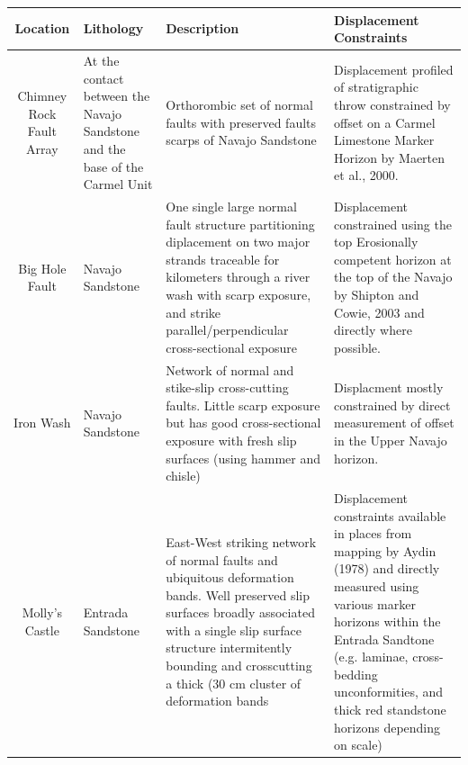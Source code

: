 \documentclass[12pt,a4paper]{article}
\begin{document}
	\afterpage %
    \clearpage%
    \thispagestyle{empty}%
    \begin{landscape}%
        \centering %
        	\begin{tabulary}{1.5\textwidth}{CLLL}

\hline
Location & Lithology & Description & Displacement Constraints \\

\hline \hline
Chimney Rock Fault Array & At the contact between the Navajo Sandstone and the base of the Carmel Unit & Orthorombic set of normal faults with preserved faults scarps of Navajo Sandstone & Displacement profiled of stratigraphic throw constrained by offset on a Carmel Limestone Marker Horizon by Maerten et al., 2000. \\

\hline
Big Hole Fault & Navajo Sandstone & One single large normal fault structure partitioning diplacement on two major strands traceable for kilometers through a river wash with scarp exposure,  and strike parallel/perpendicular cross-sectional exposure & Displacement constrained using the top Erosionally competent horizon at the top of the Navajo by Shipton and Cowie, 2003 and directly where possible. \\

\hline
Iron Wash & Navajo Sandstone & Network of normal and stike-slip cross-cutting faults. Little scarp exposure but has good cross-sectional exposure with fresh slip surfaces (using hammer and chisle) & Displacment mostly constrained by direct measurement of offset in the Upper Navajo horizon. \\

\hline
Molly's Castle & Entrada Sandstone & East-West striking network of normal faults and ubiquitous deformation bands. Well preserved slip surfaces broadly associated with a single slip surface structure intermitently bounding and crosscutting a thick (30 cm cluster of deformation bands & Displacement constraints available in places from mapping by Aydin (1978) and directly measured using various marker horizons within the Entrada Sandtone (e.g. laminae, cross-bedding unconformities, and thick red standstone horizons depending on scale) \\

\hline

			\end{tabulary}

    \end{landscape}
    \clearpage%
    
\end{document}
